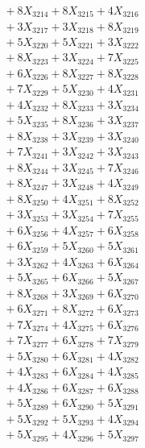 \documentclass[a4paper,10pt]{article}
\begin{document}
{\begin{align}
&\;  + 8 X_{3214} + 8 X_{3215} + 4 X_{3216} \\[0.3ex]
&\;  + 3 X_{3217} + 3 X_{3218} + 8 X_{3219} \\[0.5ex]\allowbreak
&\;  + 5 X_{3220} + 5 X_{3221} + 3 X_{3222} \\[0.3ex]
&\;  + 8 X_{3223} + 3 X_{3224} + 7 X_{3225} \\[0.3ex]
&\;  + 6 X_{3226} + 8 X_{3227} + 8 X_{3228} \\[0.3ex]
&\;  + 7 X_{3229} + 5 X_{3230} + 4 X_{3231} \\[0.3ex]
&\;  + 4 X_{3232} + 8 X_{3233} + 3 X_{3234} \\[0.3ex]
&\;  + 5 X_{3235} + 8 X_{3236} + 3 X_{3237} \\[0.3ex]
&\;  + 8 X_{3238} + 3 X_{3239} + 3 X_{3240} \\[0.3ex]
&\;  + 7 X_{3241} + 3 X_{3242} + 3 X_{3243} \\[0.3ex]
&\;  + 8 X_{3244} + 3 X_{3245} + 7 X_{3246} \\[0.3ex]
&\;  + 8 X_{3247} + 3 X_{3248} + 4 X_{3249} \\[0.5ex]\allowbreak
&\;  + 8 X_{3250} + 4 X_{3251} + 8 X_{3252} \\[0.3ex]
&\;  + 3 X_{3253} + 3 X_{3254} + 7 X_{3255} \\[0.3ex]
&\;  + 6 X_{3256} + 4 X_{3257} + 6 X_{3258} \\[0.3ex]
&\;  + 6 X_{3259} + 5 X_{3260} + 5 X_{3261} \\[0.3ex]
&\;  + 3 X_{3262} + 4 X_{3263} + 6 X_{3264} \\[0.3ex]
&\;  + 5 X_{3265} + 6 X_{3266} + 5 X_{3267} \\[0.3ex]
&\;  + 8 X_{3268} + 3 X_{3269} + 6 X_{3270} \\[0.3ex]
&\;  + 6 X_{3271} + 8 X_{3272} + 6 X_{3273} \\[0.3ex]
&\;  + 7 X_{3274} + 4 X_{3275} + 6 X_{3276} \\[0.3ex]
&\;  + 7 X_{3277} + 6 X_{3278} + 7 X_{3279} \\[0.5ex]\allowbreak
&\;  + 5 X_{3280} + 6 X_{3281} + 4 X_{3282} \\[0.3ex]
&\;  + 4 X_{3283} + 6 X_{3284} + 4 X_{3285} \\[0.3ex]
&\;  + 4 X_{3286} + 6 X_{3287} + 6 X_{3288} \\[0.3ex]
&\;  + 5 X_{3289} + 6 X_{3290} + 5 X_{3291} \\[0.3ex]
&\;  + 5 X_{3292} + 5 X_{3293} + 4 X_{3294} \\[0.3ex]
&\;  + 5 X_{3295} + 4 X_{3296} + 5 X_{3297} \\[0.3ex]

\end{align}}
\end{document}
